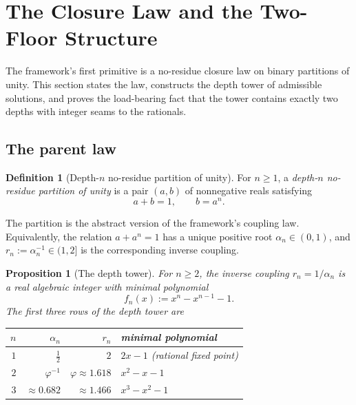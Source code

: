\documentclass[11pt,a4paper]{article}
\theoremstyle{plain}
\newtheorem{proposition}[theorem]{Proposition}
\theoremstyle{definition}
\newtheorem{definition}[theorem]{Definition}
\theoremstyle{remark}
\numberwithin{equation}{section}
\providecommand{\vp}{\varphi}
\providecommand{\half}{\tfrac{1}{2}}
\begin{document}
\section{The Closure Law and the Two-Floor Structure}
\label{sec:closure-law}

The framework's first primitive is a no-residue closure law on
binary partitions of unity.  This section states the law,
constructs the depth tower of admissible solutions, and proves the
load-bearing fact that the tower contains exactly two depths with
integer seams to the rationals.

\subsection{The parent law}

\begin{definition}[Depth-$n$ no-residue partition of unity]
\label{def:partition}
For $n \ge 1$, a \emph{depth-$n$ no-residue partition of unity} is
a pair $(a,b)$ of nonnegative reals satisfying
\begin{equation}
  a + b = 1, \qquad b = a^n.
  \label{eq:partition}
\end{equation}
\end{definition}

The partition is the abstract version of the framework's coupling
law.  Equivalently, the relation $a + a^n = 1$ has a unique
positive root $\alpha_n \in (0,1)$, and $r_n := \alpha_n^{-1} \in
(1, 2]$ is the corresponding inverse coupling.

\begin{proposition}[The depth tower]
\label{prop:tower}
For $n\ge 2$, the inverse coupling $r_n = 1/\alpha_n$ is a real
algebraic integer with minimal polynomial
\begin{equation}
  f_n(x) := x^n - x^{n-1} - 1.
  \label{eq:fn}
\end{equation}
The first three rows of the depth tower are
\begin{center}
\begin{tabular}{r r r l}
\toprule
$n$ & $\alpha_n$ & $r_n$ & minimal polynomial \\
\midrule
$1$ & $\half$       & $2$            & $2x - 1$ (rational fixed point)\\
$2$ & $\vp^{-1}$    & $\vp\approx1.618$ & $x^2 - x - 1$ \\
$3$ & $\approx0.682$ & $\approx1.466$ & $x^3 - x^2 - 1$ \\
\bottomrule
\end{tabular}
\end{center}
\end{proposition}
\end{document}
